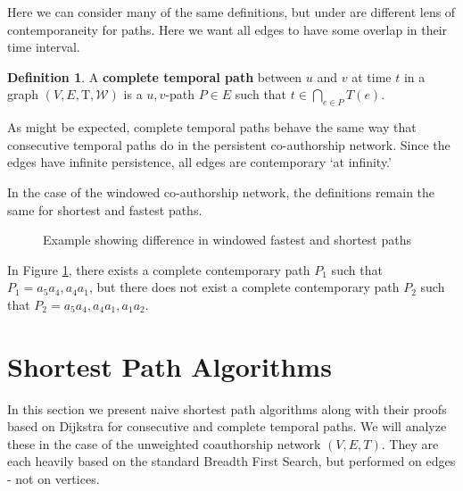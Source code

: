 \documentclass{article}
\theoremstyle{definition}
\newtheorem{defn}[thm]{Definition}
\numberwithin{thm}{subsection}
\newcommand{\W}{\mathcal{W}}
\newcommand{\T}{\text{T}}
\begin{document}
Here we can consider many of the same definitions, but under are different
lens of contemporaneity for paths. Here we want all edges to have some overlap
in their time interval.

\begin{defn}
  A \textbf{complete temporal path} between $u$ and $v$ at time $t$ in a graph
  $(V,E, \T,\W)$ is a $u,v$-path $P \in E$ such that
  $t \in \bigcap_{e \in P} T(e)$.
\end{defn}

As might be expected, complete temporal paths behave the same way
that consecutive temporal paths do in the persistent co-authorship network.
Since the edges have infinite persistence, all edges are contemporary `at
infinity.'

In the case of the windowed co-authorship network, the definitions remain the
same for shortest and fastest paths.

\begin{figure}[h] \centering
  \caption{Example showing difference in windowed fastest and shortest paths}
  \label{fig:windowed_path_ex}
\end{figure}

In Figure \ref{fig:windowed_path_ex}, there exists a complete contemporary path
$P_1$ such that $P_1 = a_5a_4,a_4a_1$, but there does not exist a complete
contemporary path $P_2$ such that $P_2 = a_5a_4,a_4a_1,a_1a_2$.

\section{ Shortest Path Algorithms}

In this section we present naive shortest path algorithms along with their proofs
based on Dijkstra for consecutive and complete temporal paths. We will analyze
these in the case of the unweighted coauthorship network $(V,E,T)$. They are each
heavily based on the standard Breadth First Search, but performed on edges -
not on vertices.
\end{document}
